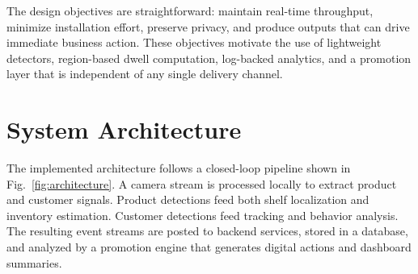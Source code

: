 \documentclass[conference]{IEEEtran}
\begin{document}
The design objectives are straightforward: maintain real-time throughput, minimize installation effort, preserve privacy, and produce outputs that can drive immediate business action. These objectives motivate the use of lightweight detectors, region-based dwell computation, log-backed analytics, and a promotion layer that is independent of any single delivery channel.

\section{System Architecture}

The implemented architecture follows a closed-loop pipeline shown in Fig.~\ref{fig:architecture}. A camera stream is processed locally to extract product and customer signals. Product detections feed both shelf localization and inventory estimation. Customer detections feed tracking and behavior analysis. The resulting event streams are posted to backend services, stored in a database, and analyzed by a promotion engine that generates digital actions and dashboard summaries.
\end{document}
